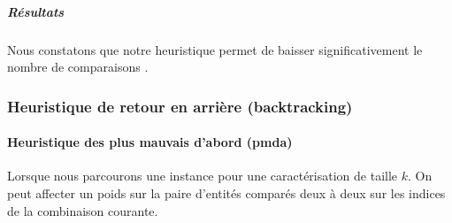 \subparagraph{Résultats}

%	
%	
%
%	
%	
%
%	
%	

Nous constatons que notre heuristique permet de baisser significativement le nombre de comparaisons .

\subsubsection{Heuristique de retour en arrière (backtracking)}
\paragraph{Heuristique des plus mauvais d'abord (pmda)}
Lorsque nous parcourons une instance pour une caractérisation de taille $k$. On peut affecter un poids sur la paire d'entités comparés deux à deux sur les indices de la combinaison courante.

